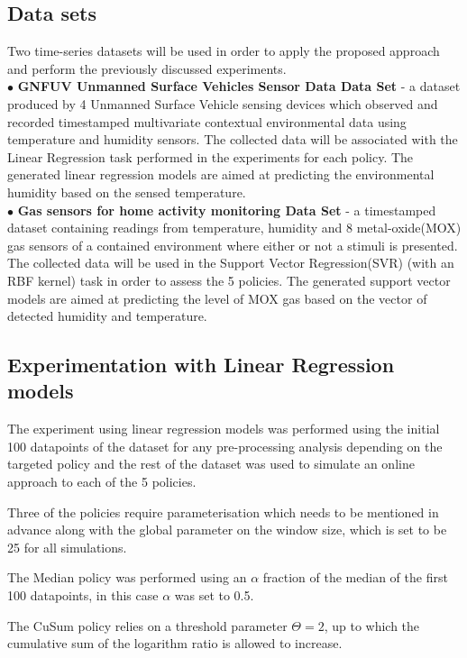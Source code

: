 \documentclass{mpaper}
\begin{document}
\subsection*{Data sets}
Two time-series datasets will be used in order to apply the proposed approach and perform the previously discussed experiments.
\\$\bullet$ \textbf{GNFUV Unmanned Surface Vehicles Sensor Data Data Set} \cite{harth2018} - a dataset produced by 4 Unmanned Surface Vehicle sensing devices which observed and recorded timestamped multivariate contextual environmental data using temperature and humidity sensors. The collected data will be associated with the Linear Regression task performed in the experiments for each policy. The generated linear regression models are aimed at predicting the environmental humidity based on the sensed temperature.
\\$\bullet$ \textbf{Gas sensors for home activity monitoring Data Set } \cite{HUERTA2016169} - a timestamped dataset containing readings from temperature, humidity and 8 metal-oxide(MOX) gas sensors of a contained environment where either or not a stimuli is presented. The collected data will be used in the Support Vector Regression(SVR) (with an RBF kernel) task in order to assess the 5 policies. The generated support vector models are aimed at predicting the level of MOX gas based on the vector of detected humidity and temperature.
\subsection{Experimentation with Linear Regression models}
The experiment using linear regression models was performed using the initial 100 datapoints of the dataset for any pre-processing analysis depending on the targeted policy and the rest of the dataset was used to simulate an online approach to each of the 5 policies.

Three of the policies require parameterisation which needs to be mentioned in advance along with the global parameter on the window size, which is set to be 25 for all simulations.

The Median policy was performed using an $\alpha$ fraction of the median of the first 100 datapoints, in this case $\alpha$ was set to 0.5.

The CuSum policy relies on a threshold parameter $\Theta = 2$, up to which the cumulative sum of the logarithm ratio is allowed to increase.
\end{document}
